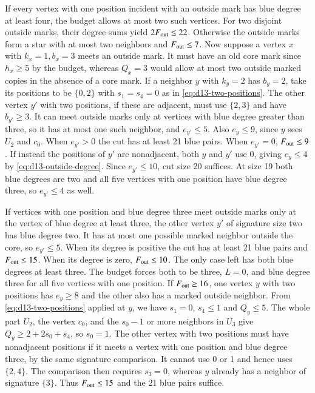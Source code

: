 If every vertex with one position incident with an outside mark has
blue degree at least four, the budget allows at most two such vertices.
For two disjoint outside marks, their degree sums yield
$2F_{\rm out}\le22$. Otherwise the outside marks form a star with
at most two neighbors and $F_{\rm out}\le7$. Now suppose a vertex
$x$ with $k_x=1,b_x=3$ meets an outside mark. It must have an old
core mark since $h_x\ge5$ by the budget, whereas $Q_x=3$ would
allow at most two outside marked copies in the absence of a core mark.
If a neighbor $y$ with $k_y=2$ has $b_y=2$, take its positions to
be $\{0,2\}$ with $s_1=s_4=0$ as in \eqref{eq:d13-two-positions}.
The other vertex $y'$ with two positions, if these are adjacent, must
use $\{2,3\}$ and have $b_{y'}\ge3$. It can meet outside marks only
at vertices with blue degree greater than three, so it has at most
one such neighbor, and $e_{y'}\le5$. Also $e_y\le9$, since $y$
sees $U_2$ and $c_0$. When $e_{y'}>0$ the cut has at least 21
blue pairs. When $e_{y'}=0$, $F_{\rm out}\le9$. If instead the positions
of $y'$ are nonadjacent, both $y$ and $y'$ use 0, giving $e_y\le4$
by \eqref{eq:d13-outside-degree}. Since $e_{y'}\le10$, cut size
20 suffices. At size 19 both blue degrees are two and all five vertices
with one position have blue degree three, so $e_{y'}\le4$ as well.

If vertices with one position and blue degree three meet outside marks
only at the vertex of blue degree at least three, the other vertex $y'$
of signature size two has blue degree two. It has at most one possible
marked neighbor outside the core, so $e_{y'}\le5$. When its degree is positive the cut has at least 21 blue
pairs and $F_{\rm out}\le15$. When its degree is zero, $F_{\rm out}\le10$.
The only case left has both blue degrees at least three. The budget
forces both to be three, $L=0$, and blue degree three for all five
vertices with one position. If $F_{\rm out}\ge16$, one vertex $y$
with two positions has $e_y\ge8$ and the other also has a marked
outside neighbor. From \eqref{eq:d13-two-positions} applied at $y$,
we have $s_1=0$, $s_4\le1$ and $Q_y\le5$. The whole part $U_2$,
the vertex $c_0$, and the $s_0-1$ or more neighbors in $U_3$ give
$Q_y\ge2+2s_0+s_4$, so $s_0=1$. The other vertex with two positions
must have nonadjacent positions if it meets a vertex with one
position and blue degree three, by the same signature comparison.
It cannot use 0 or 1 and hence uses $\{2,4\}$. The comparison then
requires $s_3=0$, whereas $y$ already has a neighbor of signature
$\{3\}$. Thus $F_{\rm out}\le15$ and the 21 blue pairs suffice.

